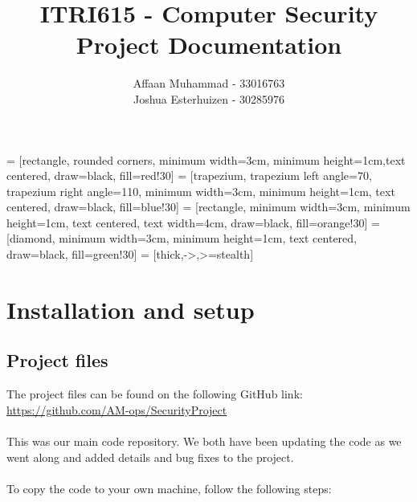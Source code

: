 \documentclass[a4paper, 12pt, titlepage]{report}
\begin{document}
 = [rectangle, rounded corners, minimum width=3cm, minimum height=1cm,text centered, draw=black, fill=red!30]
 = [trapezium, trapezium left angle=70, trapezium right angle=110, minimum width=3cm, minimum height=1cm, text centered, draw=black, fill=blue!30]
 = [rectangle, minimum width=3cm, minimum height=1cm, text centered, text width=4cm, draw=black, fill=orange!30]
 = [diamond, minimum width=3cm, minimum height=1cm, text centered, draw=black, fill=green!30]
 = [thick,->,>=stealth]
\linespread{1.25}
\author{Affaan Muhammad - 33016763\\Joshua Esterhuizen - 30285976}
\title{ITRI615 - Computer Security\\Project Documentation}
\date{}
\maketitle
\tableofcontents{}

\chapter{Installation and setup}
\section{Project files}
The project files can be found on the following GitHub link:\\
\url{https://github.com/AM-ops/SecurityProject}
\\\\This was our main code repository. We both have been updating the code as we went along and added details and bug fixes to the project.\\\\
To copy the code to your own machine, follow the following steps:
\end{document}
